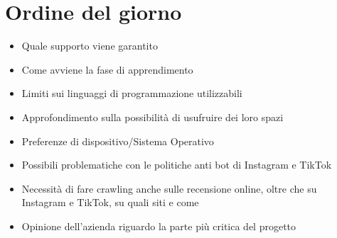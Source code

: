 \section{Ordine del giorno}
\begin{itemize}
    \item Quale supporto viene garantito
    \item Come avviene la fase di apprendimento
    \item Limiti sui linguaggi di programmazione utilizzabili
    \item Approfondimento sulla possibilità di usufruire
    dei loro spazi
    \item Preferenze di dispositivo/Sistema Operativo 
    \item Possibili problematiche con le politiche anti bot
    di Instagram e TikTok
    \item Necessità di fare crawling anche sulle recensione
    online, oltre che su Instagram e TikTok, su quali siti e come
    \item Opinione dell'azienda riguardo la parte più critica del
    progetto 
\end{itemize}
